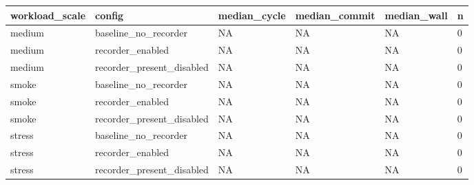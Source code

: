 \begin{tabular}{llllll}
 \hline
workload\_scale & config & median\_cycle & median\_commit & median\_wall & n \\
 \hline
medium & baseline\_no\_recorder & NA & NA & NA & 0 \\
medium & recorder\_enabled & NA & NA & NA & 0 \\
medium & recorder\_present\_disabled & NA & NA & NA & 0 \\
smoke & baseline\_no\_recorder & NA & NA & NA & 0 \\
smoke & recorder\_enabled & NA & NA & NA & 0 \\
smoke & recorder\_present\_disabled & NA & NA & NA & 0 \\
stress & baseline\_no\_recorder & NA & NA & NA & 0 \\
stress & recorder\_enabled & NA & NA & NA & 0 \\
stress & recorder\_present\_disabled & NA & NA & NA & 0 \\
 \hline
\end{tabular}
